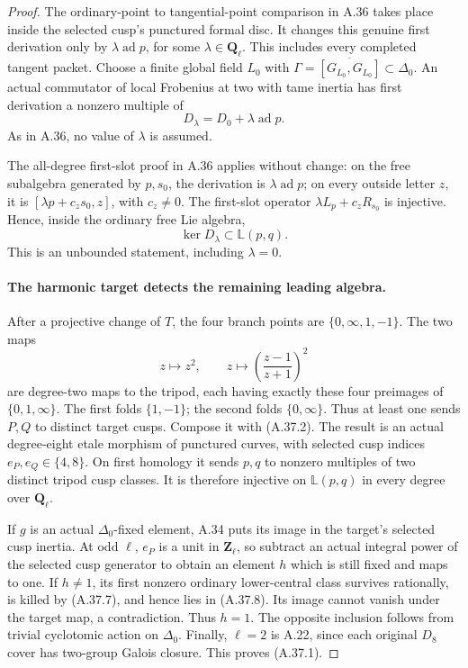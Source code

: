 \begin{proof}
The ordinary-point to tangential-point comparison in
A.36 takes place inside the selected cusp's punctured
formal disc. It changes this genuine first derivation
only by \(\lambda\operatorname{ad}p\), for some
\(\lambda\in\mathbf Q_\ell\). This includes every
completed tangent packet. Choose a finite global field
\(L_0\) with \(\Gamma=\overline{[G_{L_0},G_{L_0}]}\subset\Delta_0\).
An actual commutator of local Frobenius at two with
tame inertia has first derivation a nonzero multiple
of
\[
                 D_\lambda=D_0+\lambda\operatorname{ad}p.
                                                               \tag{A.37.7}
\]
As in A.36, no value of \(\lambda\) is assumed.

The all-degree first-slot proof in A.36 applies
without change: on the free subalgebra generated by
\(p,s_0\), the derivation is \(\lambda\operatorname{ad}p\);
on every outside letter \(z\), it is
\([\lambda p+c_zs_0,z]\), with \(c_z\ne0\).
The first-slot operator \(\lambda L_p+c_zR_{s_0}\)
is injective. Hence, inside the ordinary free Lie algebra,
\[
                  \ker D_\lambda\subset\mathbb L(p,q).
                                                               \tag{A.37.8}
\]
This is an unbounded statement, including \(\lambda=0\).

\paragraph{The harmonic target detects the remaining leading algebra.}
After a projective change of \(T\), the four branch
points are \(\{0,\infty,1,-1\}\). The two maps
\[
                   z\longmapsto z^2,
          \qquad z\longmapsto\left(\frac{z-1}{z+1}\right)^2
                                                               \tag{A.37.9}
\]
are degree-two maps to the tripod, each having exactly
these four preimages of \(\{0,1,\infty\}\).
The first folds \(\{1,-1\}\); the second folds
\(\{0,\infty\}\). Thus at least one sends \(P,Q\)
to distinct target cusps. Compose it with (A.37.2).
The result is an actual degree-eight etale morphism
of punctured curves, with selected cusp indices
\(e_P,e_Q\in\{4,8\}\).
On first homology it sends \(p,q\) to nonzero
multiples of two distinct tripod cusp classes.
It is therefore injective on \(\mathbb L(p,q)\)
in every degree over \(\mathbf Q_\ell\).

If \(g\) is an actual \(\Delta_0\)-fixed element,
A.34 puts its image in the target's selected cusp
inertia. At odd \(\ell\), \(e_P\) is a unit in
\(\mathbf Z_\ell\), so subtract an actual integral
power of the selected cusp generator to obtain an
element \(h\) which is still fixed and maps to one.
If \(h\ne1\), its first nonzero ordinary lower-central
class survives rationally, is killed by (A.37.7),
and hence lies in (A.37.8). Its image cannot vanish
under the target map, a contradiction. Thus \(h=1\).
The opposite inclusion follows from trivial cyclotomic
action on \(\Delta_0\). Finally, \(\ell=2\) is A.22,
since each original \(D_8\) cover has two-group
Galois closure. This proves (A.37.1).


\end{proof}
